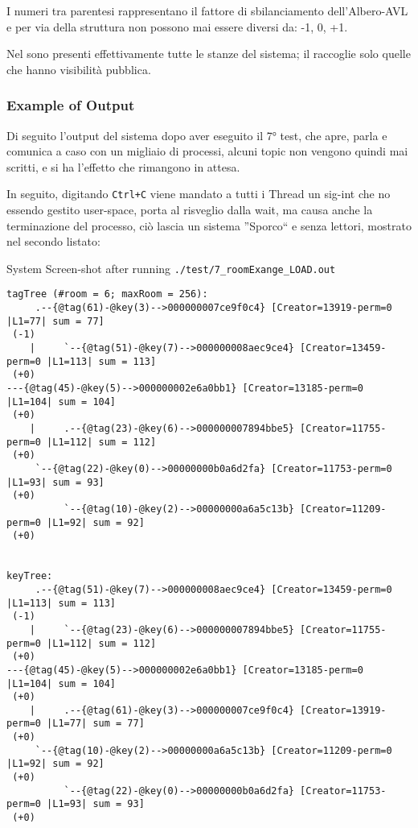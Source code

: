 I numeri tra parentesi rappresentano il fattore di sbilanciamento dell'Albero-AVL e per via della struttura non possono
mai essere diversi da: -1, 0, +1.

Nel \tagTree sono presenti effettivamente tutte le stanze del sistema; il \keyTree raccoglie solo quelle che hanno
visibilità pubblica.

\subsubsection{Example of Output}

Di seguito l'output del sistema dopo aver eseguito il 7° test, che apre, parla e comunica a caso con un migliaio di
processi, alcuni topic non vengono quindi mai scritti, e si ha l'effetto che rimangono in attesa.

In seguito, digitando \verb|Ctrl+C| viene mandato a tutti i Thread un sig-int che no essendo gestito user-space, porta
al risveglio dalla wait, ma causa anche la terminazione del processo, ciò lascia un sistema ''Sporco`` e senza lettori,
mostrato nel secondo listato:

\newpage

\begin{center}\begin{large}
System Screen-shot after running \verb |./test/7_roomExange_LOAD.out|
\end{large}\end{center}
\begin{indentPar}{1.25cm}
\begin{scriptsize}\begin{verbatim}
tagTree (#room = 6; maxRoom = 256):
     .--{@tag(61)-@key(3)-->000000007ce9f0c4} [Creator=13919-perm=0 |L1=77| sum = 77]
 (-1)
    |     `--{@tag(51)-@key(7)-->000000008aec9ce4} [Creator=13459-perm=0 |L1=113| sum = 113]
 (+0)
---{@tag(45)-@key(5)-->000000002e6a0bb1} [Creator=13185-perm=0 |L1=104| sum = 104]
 (+0)
    |     .--{@tag(23)-@key(6)-->000000007894bbe5} [Creator=11755-perm=0 |L1=112| sum = 112]
 (+0)
     `--{@tag(22)-@key(0)-->00000000b0a6d2fa} [Creator=11753-perm=0 |L1=93| sum = 93]
 (+0)
          `--{@tag(10)-@key(2)-->00000000a6a5c13b} [Creator=11209-perm=0 |L1=92| sum = 92]
 (+0)


keyTree:
     .--{@tag(51)-@key(7)-->000000008aec9ce4} [Creator=13459-perm=0 |L1=113| sum = 113]
 (-1)
    |     `--{@tag(23)-@key(6)-->000000007894bbe5} [Creator=11755-perm=0 |L1=112| sum = 112]
 (+0)
---{@tag(45)-@key(5)-->000000002e6a0bb1} [Creator=13185-perm=0 |L1=104| sum = 104]
 (+0)
    |     .--{@tag(61)-@key(3)-->000000007ce9f0c4} [Creator=13919-perm=0 |L1=77| sum = 77]
 (+0)
     `--{@tag(10)-@key(2)-->00000000a6a5c13b} [Creator=11209-perm=0 |L1=92| sum = 92]
 (+0)
          `--{@tag(22)-@key(0)-->00000000b0a6d2fa} [Creator=11753-perm=0 |L1=93| sum = 93]
 (+0)
\end{verbatim}\end{scriptsize}
\end{indentPar}

